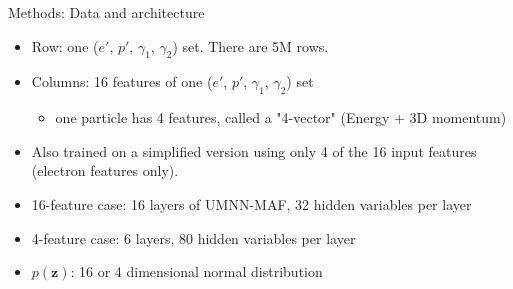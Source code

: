 \documentclass[aspectratio=169]{beamer}
\begin{document}
\begin{frame}{Methods: Data and architecture}
    \begin{itemize}
        \item Row: one ($e' $, $p'$, $\gamma_1$, $\gamma_2$) set. There are 5M rows.
        \item Columns: 16 features of one ($e' $, $p'$, $\gamma_1$, $\gamma_2$) set\\
        \begin{itemize}
            \item one particle has 4 features, called a "4-vector" (Energy + 3D momentum)\\
        \end{itemize}
        \item Also trained on a simplified version using only 4 of the 16 input features (electron features only).\\\vspace{0.05\textwidth}
        \item 16-feature case: 16 layers of UMNN-MAF, 32 hidden variables per layer
        \item 4-feature case: 6 layers, 80 hidden variables per layer
        \item $p(\mathbf{z})$: 16 or 4 dimensional normal distribution
    \end{itemize}
\end{frame}
\end{document}
